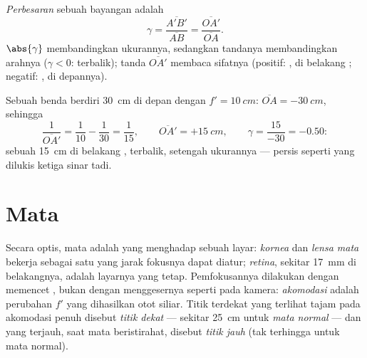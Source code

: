 \begin{definition}[Perbesaran]\label{def:g11:lenses-and-eye:magnification}
\emph{Perbesaran} sebuah bayangan adalah
\[
\gamma = \frac{\overline{A'B'}}{\overline{AB}}
       = \frac{\overline{OA'}}{\overline{OA}} .
\]
$\abs{\gamma}$ membandingkan ukurannya, sedangkan tandanya
membandingkan arahnya ($\gamma < 0$: terbalik); tanda
$\overline{OA'}$ membaca sifatnya (positif: , di belakang ;
negatif: , di depannya).
\end{definition}

\begin{example}\label{ex:g11:lenses-and-eye:conjugate}
Sebuah benda berdiri \qty{30}{cm} di depan  dengan
$f' = \qty{10}{cm}$: $\overline{OA} = \qty{-30}{cm}$, sehingga
\[
\frac{1}{\overline{OA'}} = \frac{1}{10} - \frac{1}{30} = \frac{1}{15},
\qquad \overline{OA'} = +\qty{15}{cm},
\qquad \gamma = \frac{15}{-30} = -0.50 :
\]
sebuah  \qty{15}{cm} di belakang , terbalik,
setengah ukurannya --- persis seperti yang dilukis ketiga sinar tadi.
\end{example}

\section{Mata}

\begin{definition}\label{def:g11:lenses-and-eye:eye}
Secara optis, mata adalah  yang menghadap sebuah layar:
\emph{kornea} dan \emph{lensa mata}
bekerja sebagai satu  yang jarak fokusnya dapat diatur;
\emph{retina}, sekitar \qty{17}{mm} di belakangnya,
adalah layarnya yang tetap. Pemfokusannya dilakukan dengan memencet
, bukan dengan menggesernya seperti pada kamera:
\emph{akomodasi} adalah perubahan $f'$ yang dihasilkan
otot siliar. Titik terdekat yang terlihat tajam pada akomodasi penuh
disebut \emph{titik dekat} --- sekitar \qty{25}{cm}
untuk \emph{mata normal} --- dan yang terjauh, saat
mata beristirahat, disebut \emph{titik jauh} (tak
terhingga untuk mata normal).
\end{definition}

